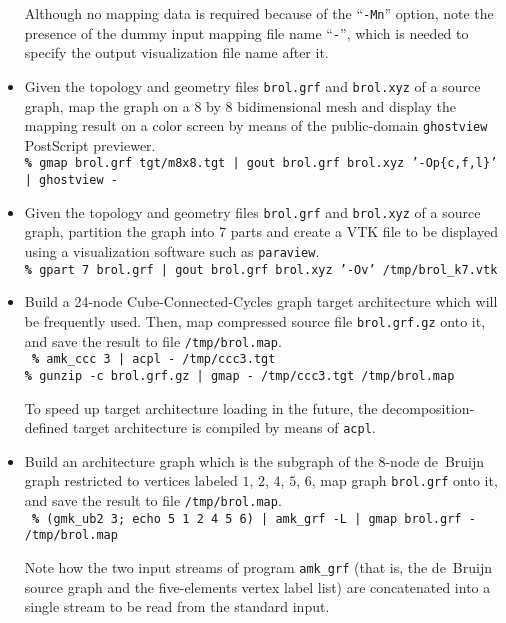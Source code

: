 \begin{itemize}
\noi
Although no mapping data is required because of the ``\texttt{-Mn}''
option, note the presence of the dummy input mapping file name
``\texttt{-}'', which is needed to specify the output visualization
file name after it.
\item
Given the topology and geometry files \texttt{brol.grf} and
\texttt{brol.xyz} of a source graph, map the graph on a 8 by 8
bidimensional mesh and display the mapping result on a color screen by
means of the public-domain \texttt{ghostview} PostScript previewer.
\\

\noi
\texttt{{\bf\%} gmap brol.grf tgt/m8x8.tgt | gout brol.grf brol.xyz '-Op\{c,f,l\}' | ghostview -}
\item
Given the topology and geometry files \texttt{brol.grf} and
\texttt{brol.xyz} of a source graph, partition the graph into 7 parts
and create a VTK file to be displayed using a visualization software
such as \texttt{paraview}.
\\

\noi
\texttt{{\bf\%} gpart 7 brol.grf | gout brol.grf brol.xyz '-Ov' /tmp/brol\_k7.vtk}
\item
Build a 24-node Cube-Connected-Cycles graph target architecture which will be
frequently used. Then, map compressed source file \texttt{brol.grf.gz} onto it,
and save the result to file \texttt{/tmp/brol.map}.
\\

\noi
{\tt
{\bf\%} amk\_ccc 3 | acpl - /tmp/ccc3.tgt\\
{\bf\%} gunzip -c brol.grf.gz | gmap - /tmp/ccc3.tgt /tmp/brol.map
}
\spa

\noi
To speed up target architecture loading in the future, the
decomposition-defined target architecture is compiled by means of \texttt{acpl}.
\item
Build an architecture graph which is the subgraph of the $8$-node de~Bruijn
graph restricted to vertices labeled $1$, $2$, $4$, $5$, $6$, map graph
\texttt{brol.grf} onto it, and save the result to file \texttt{/tmp/brol.map}.
\\

\noi
{\tt
{\bf\%} (gmk\_ub2 3; echo 5 1 2 4 5 6) | amk\_grf -L |
gmap brol.grf - /tmp/brol.map}
\spa

\noi
Note how the two input streams of program \texttt{amk\_grf} (that is, the
de~Bruijn source graph and the five-elements vertex label list) are
concatenated into a single stream to be read from the standard input.


\end{itemize}
